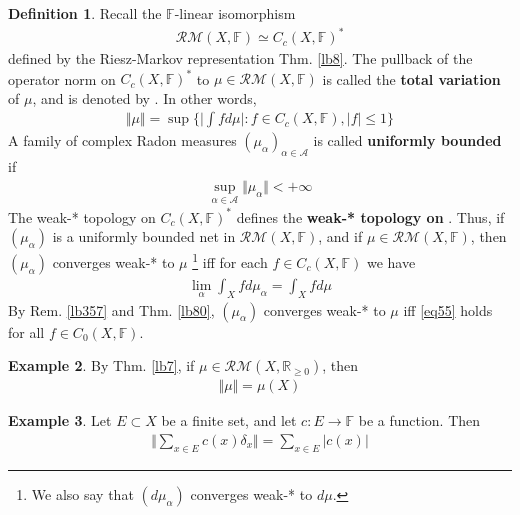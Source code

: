 \documentclass[12pt,b5paper,notitlepage]{article}
\theoremstyle{definition}
\newtheorem{df}{Definition}[subsection]
\newtheorem{eg}[df]{Example}
\theoremstyle{plain}
\newcommand{\scr}{\mathscr}
\newcommand{\Rbb}{\mathbb R}
\newcommand{\Fbb}{\mathbb F}
\newcommand{\RM}{\mathcal {RM}}
\numberwithin{equation}{section}
\begin{document}
\begin{df}\label{lb374}
Recall the $\Fbb$-linear isomorphism
\begin{align*}
\RM(X,\Fbb)\simeq C_c(X,\Fbb)^*
\end{align*}
defined by the Riesz-Markov representation Thm. \ref{lb8}. The pullback of the operator norm on $C_c(X,\Fbb)^*$ to $\mu\in\RM(X,\Fbb)$ is called the \textbf{total variation} of $\mu$, and is denoted by \pmb{$\Vert\mu\Vert$}.   In other words,
\begin{align*}
\Vert\mu\Vert=\sup\Big\{\Big|\int fd\mu\Big|:f\in C_c(X,\Fbb),|f|\leq1 \Big\}
\end{align*}
A family of complex Radon measures $(\mu_\alpha)_{\alpha\in\scr A}$ is called \textbf{uniformly bounded}  if
\begin{align*}
\sup_{\alpha\in\scr A}\Vert\mu_\alpha\Vert<+\infty
\end{align*}
The weak-* topology on $C_c(X,\Fbb)^*$ defines the \textbf{weak-* topology on \pmb{$\RM(X,\Fbb)$}}. Thus, if $(\mu_\alpha)$ is a uniformly bounded net in $\RM(X,\Fbb)$, and if $\mu\in\RM(X,\Fbb)$, then $(\mu_\alpha)$ converges weak-* to $\mu$ \footnote{We also say that $(d\mu_\alpha)$ converges weak-* to $d\mu$.} iff for each $f\in C_c(X,\Fbb)$ we have
\begin{align}\label{eq55}
\lim_\alpha\int_Xfd\mu_\alpha=\int_X fd\mu
\end{align}
By Rem. \ref{lb357} and Thm. \ref{lb80}, $(\mu_\alpha)$ converges weak-* to $\mu$ iff \eqref{eq55} holds for all $f\in C_0(X,\Fbb)$.
\end{df}






\begin{eg}\label{lb99}
By Thm. \ref{lb7}, if $\mu\in\RM(X,\Rbb_{\geq0})$, then
\begin{align*}
\Vert\mu\Vert=\mu(X)
\end{align*}
\end{eg}


\begin{eg}\label{lb103}
Let $E\subset X$ be a finite set, and let $c:E\rightarrow\Fbb$ be a function. Then
\begin{align}
\Big\Vert  \sum_{x\in E}c(x)\delta_x\Big\Vert=\sum_{x\in E}|c(x)|
\end{align}
\end{eg}
\end{document}
